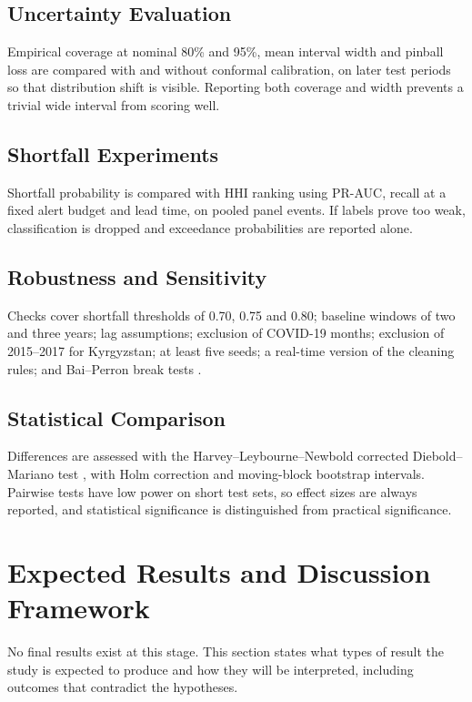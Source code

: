 \documentclass[conference]{IEEEtran}
\begin{document}
\subsection{Uncertainty Evaluation}
Empirical coverage at nominal 80\% and 95\%, mean interval width and pinball loss are compared with and without conformal calibration, on later test periods so that distribution shift is visible. Reporting both coverage and width prevents a trivial wide interval from scoring well.

\subsection{Shortfall Experiments}
Shortfall probability is compared with HHI ranking using PR-AUC, recall at a fixed alert budget and lead time, on pooled panel events. If labels prove too weak, classification is dropped and exceedance probabilities are reported alone.

\subsection{Robustness and Sensitivity}
Checks cover shortfall thresholds of 0.70, 0.75 and 0.80; baseline windows of two and three years; lag assumptions; exclusion of COVID-19 months; exclusion of 2015--2017 for Kyrgyzstan; at least five seeds; a real-time version of the cleaning rules; and Bai--Perron break tests \cite{bai2003}.

\subsection{Statistical Comparison}
Differences are assessed with the Harvey--Leybourne--Newbold corrected Diebold--Mariano test \cite{diebold1995,harvey1997}, with Holm correction and moving-block bootstrap intervals. Pairwise tests have low power on short test sets, so effect sizes are always reported, and statistical significance is distinguished from practical significance.

\section{Expected Results and Discussion Framework}\label{sec:expected}
No final results exist at this stage. This section states what types of result the study is expected to produce and how they will be interpreted, including outcomes that contradict the hypotheses.
\end{document}
